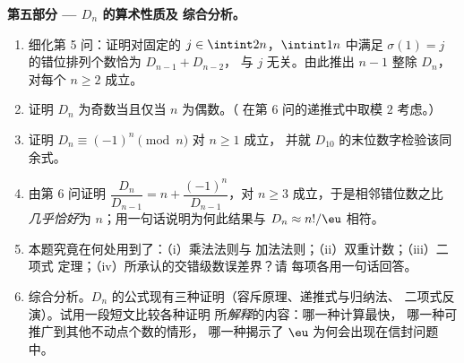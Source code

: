 \begin{problem}
\medskip
\noindent\textbf{第五部分 --- $D_n$ 的算术性质及
综合分析。}
\begin{enumerate}[resume]
  \item 细化第 5 问：证明对固定的 $j \in
        \intint2n$，$\intint1n$ 中满足
        $\sigma(1) = j$ 的错位排列个数恰为 $D_{n-1} + D_{n-2}$，
        与 $j$ 无关。由此推出 $n - 1$ 整除 $D_n$，
        对每个 $n \geq 2$ 成立。
  \item 证明 $D_n$ 为奇数当且仅当 $n$ 为偶数。（
        在第 6 问的递推式中取模 $2$ 考虑。）
  \item 证明 $D_n \equiv (-1)^n \pmod n$ 对 $n \geq 1$ 成立，
        并就 $D_{10}$ 的末位数字检验该同余式。
  \item 由第 6 问证明 $\dfrac{D_n}{D_{n-1}} = n +
        \dfrac{(-1)^n}{D_{n-1}}$，对 $n \geq 3$ 成立，于是相邻错位数之比
        \emph{几乎恰好}为
        $n$；用一句话说明为何此结果与
        $D_n \approx n!/\eu$ 相符。
  \item 本题究竟在何处用到了：（i）乘法法则与
        加法法则；（ii）双重计数；（iii）二项式
        定理；（iv）所承认的交错级数误差界？请
        每项各用一句话回答。
  \item 综合分析。$D_n$ 的公式现有三种证明（容斥原理、递推式与归纳法、
        二项式反演）。试用一段短文比较各种证明
        所\emph{解释}的内容：哪一种计算最快，
        哪一种可推广到其他不动点个数的情形，
        哪一种揭示了
        $\eu$ 为何会出现在信封问题中。
\end{enumerate}
\end{problem}
